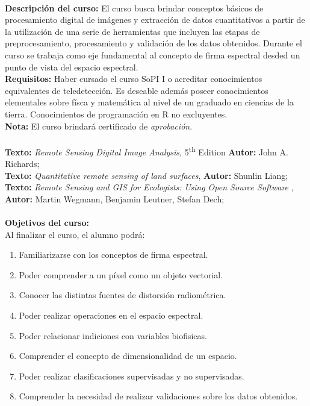\documentclass[11pt]{article}
\begin{document}
\textbf {\large \\ Descripción del curso:} El curso busca brindar conceptos básicos de procesamiento digital de imágenes y extracción de datos cuantitativos a partir de la utilización de una serie de herramientas que incluyen las etapas de preprocesamiento, procesamiento y validación de los datos obtenidos. Durante el curso se trabaja como eje fundamental al concepto de firma espectral desded un punto de vista del espacio espectral.\\
\textbf {Requisitos:} Haber cursado el curso SoPI I o acreditar conocimientos
equivalentes de teledetección. Es deseable además poseer conocimientos elementales sobre físca y matemática al nivel de un graduado en ciencias de la tierra. Conocimientos de programación en R no excluyentes.
\\
\textbf {Nota:} El curso brindará certificado de {\it aprobación}.
\\
\\
\textbf {\large Texto:} \emph{Remote Sensing Digital Image Analysis},
5\textsuperscript{th} Edition
\textbf {Autor:} John A. Richards; \\
\textbf {\large Texto:} \emph{Quantitative remote sensing of land surfaces},
\textbf {Autor:} Shunlin Liang;\\
\textbf {\large Texto:} \emph{Remote Sensing and GIS for Ecologists: Using Open Source Software },
\textbf {Autor:} Martin Wegmann, Benjamin Leutner, Stefan Dech;\\
\\
\textbf {\large Objetivos del curso:} \\
Al finalizar el curso, el alumno podr\'a:
\begin{enumerate} \itemsep-0.4em
  \item Familiarizarse con los conceptos de firma espectral.
  \item Poder comprender a un píxel como un objeto vectorial.
  \item Conocer las distintas fuentes de distorsión radiométrica.
  \item Poder realizar operaciones en el espacio espectral.
  \item Poder relacionar indiciones con variables biofisicas.
  \item Comprender el concepto de dimensionalidad de un espacio.
  \item Poder realizar clasificaciones supervisadas y no supervisadas.
  \item Comprender la necesidad de realizar validaciones sobre los datos
      obtenidos.
\end{enumerate}
\end{document}

